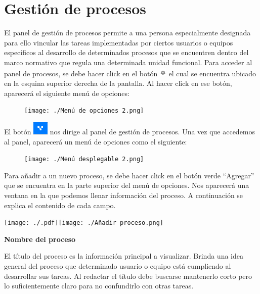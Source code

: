 \documentclass[
  letterpaper,
  DIV=11,
  numbers=noendperiod]{scrreprt}
\begin{document}
\hypertarget{gestiuxf3n-de-procesos}{%
\section{Gestión de procesos}\label{gestiuxf3n-de-procesos}}

El panel de gestión de procesos permite a una persona especialmente
designada para ello vincular las tareas implementadas por ciertos
usuarios o equipos específicos al desarrollo de determinados procesos
que se encuentren dentro del marco normativo que regula una determinada
unidad funcional. Para acceder al panel de procesos, se debe hacer click
en el botón
\includegraphics[width=0.13542in,height=0.17708in]{./img/manual-admin/Tuerca.png}
el cual se encuentra ubicado en la esquina superior derecha de la
pantalla. Al hacer click en ese botón, aparecerá el siguiente menú de
opciones:

\begin{figure}

{\centering \texttt{[image: ./Menú de opciones 2.png]}

}

\end{figure}

El botón
\includegraphics[width=0.29167in,height=0.25in]{./Botón de gestión de procesos.png}
nos dirige al panel de gestión de procesos. Una vez que accedemos al
panel, aparecerá un menú de opciones como el siguiente:

\begin{figure}

{\centering \texttt{[image: ./Menú desplegable 2.png]}

}

\end{figure}

Para añadir a un nuevo proceso, se debe hacer click en el botón verde
``Agregar'' que se encuentra en la parte superior del menú de opciones.
Nos aparecerá una ventana en la que podemos llenar información del
proceso. A continuación se explica el contenido de cada campo.

\texttt{[image: ./.pdf]}\texttt{[image: ./Añadir proceso.png]}

\textbf{Nombre del proceso}

El título del proceso es la información principal a visualizar. Brinda
una idea general del proceso que determinado usuario o equipo está
cumpliendo al desarrollar sus tareas. Al redactar el título debe
buscarse mantenerlo corto pero lo suficientemente claro para no
confundirlo con otras tareas.
\end{document}
